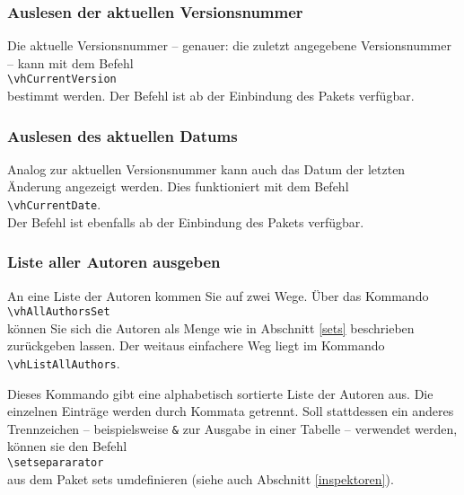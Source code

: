 \subsubsection{Auslesen der aktuellen Versionsnummer}
Die aktuelle Versionsnummer -- genauer: die zuletzt angegebene Versionsnummer -- kann mit dem Befehl\\
\mbox{}\hspace{2em}\verb|\vhCurrentVersion|\\
bestimmt werden. Der Befehl ist ab der Einbindung des Pakets verfügbar.

\subsubsection{Auslesen des aktuellen Datums}
Analog zur aktuellen Versionsnummer kann auch das Datum der letzten Änderung angezeigt werden. Dies funktioniert mit dem Befehl\\
\mbox{}\hspace{2em}\verb|\vhCurrentDate|.\\
Der Befehl ist ebenfalls ab der Einbindung des Pakets verfügbar.

\subsubsection{Liste aller Autoren ausgeben}
An eine Liste der Autoren kommen Sie auf zwei Wege. Über das Kommando\\
\mbox{}\hspace{2em}\verb|\vhAllAuthorsSet|\\
können Sie sich die Autoren als Menge wie in Abschnitt \ref{sets} beschrieben zurückgeben lassen. Der weitaus einfachere Weg liegt im Kommando\\
\mbox{}\hspace{2em}\verb|\vhListAllAuthors|.

Dieses Kommando gibt eine alphabetisch sortierte Liste der Autoren aus. Die einzelnen Einträge werden durch Kommata getrennt. Soll stattdessen ein anderes Trennzeichen -- beispielsweise \texttt{\&} zur Ausgabe in einer Tabelle -- verwendet werden, können sie den Befehl\\
\mbox{}\hspace{2em}\verb|\setsepararator|\\
aus dem Paket sets umdefinieren (siehe auch Abschnitt \ref{inspektoren}).

